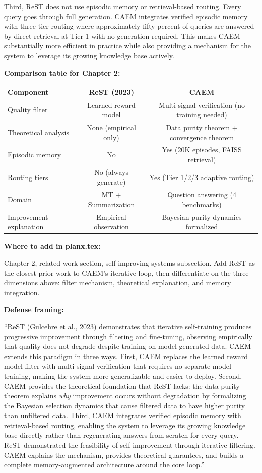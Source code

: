 \documentclass[11pt,a4paper]{article}
\begin{document}
{Third, ReST does not use episodic memory or retrieval-based routing. Every query goes through full generation. CAEM integrates verified episodic memory with three-tier routing where approximately fifty percent of queries are answered by direct retrieval at Tier 1 with no generation required. This makes CAEM substantially more efficient in practice while also providing a mechanism for the system to leverage its growing knowledge base actively.

\textbf{Comparison table for Chapter 2:}

\begin{center}
\small
\begin{tabular}{lcc}
\toprule
\textbf{Component} & \textbf{ReST (2023)} & \textbf{CAEM} \\
\midrule
Quality filter & Learned reward model & Multi-signal verification (no training needed) \\
Theoretical analysis & None (empirical only) & Data purity theorem + convergence theorem \\
Episodic memory & No & Yes (20K episodes, FAISS retrieval) \\
Routing tiers & No (always generate) & Yes (Tier 1/2/3 adaptive routing) \\
Domain & MT + Summarization & Question answering (4 benchmarks) \\
Improvement explanation & Empirical observation & Bayesian purity dynamics formalized \\
\bottomrule
\end{tabular}
\end{center}

\textbf{Where to add in planx.tex:}

Chapter 2, related work section, self-improving systems subsection. Add ReST as the closest prior work to CAEM's iterative loop, then differentiate on the three dimensions above: filter mechanism, theoretical explanation, and memory integration.

\textbf{Defense framing:}

``ReST (Gulcehre et al., 2023) demonstrates that iterative self-training produces progressive improvement through filtering and fine-tuning, observing empirically that quality does not degrade despite training on model-generated data. CAEM extends this paradigm in three ways. First, CAEM replaces the learned reward model filter with multi-signal verification that requires no separate model training, making the system more generalizable and easier to deploy. Second, CAEM provides the theoretical foundation that ReST lacks: the data purity theorem explains \textit{why} improvement occurs without degradation by formalizing the Bayesian selection dynamics that cause filtered data to have higher purity than unfiltered data. Third, CAEM integrates verified episodic memory with retrieval-based routing, enabling the system to leverage its growing knowledge base directly rather than regenerating answers from scratch for every query. ReST demonstrated the feasibility of self-improvement through iterative filtering. CAEM explains the mechanism, provides theoretical guarantees, and builds a complete memory-augmented architecture around the core loop.''
}
\end{document}
